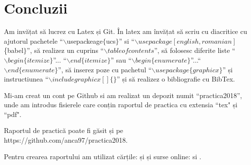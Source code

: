 \documentclass{report}
\begin{document}
\chapter{Concluzii}
\hspace*{0.3cm} Am invățat să lucrez cu Latex și Git. În latex am învățat să scriu cu diacritice cu ajutorul pachetele  ``$\backslash$usepackeage$\{$ucs$\}$'' si ``$\backslash usepackage[english,romanian]$\{babel$\}$'', să realizez un cuprins ``$\backslash tableofcontents$'', să folosesc diferite liste ``$\backslash begin\{itemize\}$''... ``$\backslash end\{itemize\}$'' sau ``$\backslash begin\{enumerate\}$''...``$\backslash end\{enumerate\}$'', să inserez poze cu pachetul ``$\backslash usepackage\{graphicx\}$'' și instructiunea ``$\backslash  includegraphicx[]\{\}$'' și să realizez o bibliografie cu BibTex.

Mi-am creat un cont pe Github si am realizat un depozit numit ``practica2018'', unde am introdus fisierele care conțin raportul de practica cu extensia ``tex" și ``pdf".

Raportul de practică poate fi găsit și pe https://github.com/anca97/practica2018.

Pentru crearea raportului am utilizat cărțile: \cite{book:2}  și \cite{book:1} și surse online:  \cite{3} si \cite{4}. 

 
\newpage
 

\end{document}
